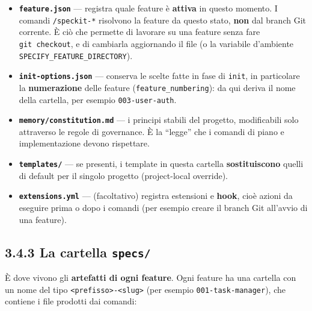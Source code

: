 \documentclass[
  italian,
  10pt,
]{book}
\providecommand{\tightlist}{%
  \setlength{\itemsep}{0pt}\setlength{\parskip}{0pt}}
\begin{document}
\begin{itemize}
\tightlist
\item
  \textbf{\texttt{feature.json}} --- registra quale feature è
  \textbf{attiva} in questo momento. I comandi \texttt{/speckit-*}
  risolvono la feature da questo stato, \textbf{non} dal branch Git
  corrente. È ciò che permette di lavorare su una feature senza fare
  \texttt{git\ checkout}, e di cambiarla aggiornando il file (o la
  variabile d'ambiente \texttt{SPECIFY\_FEATURE\_DIRECTORY}).
\item
  \textbf{\texttt{init-options.json}} --- conserva le scelte fatte in
  fase di \texttt{init}, in particolare la \textbf{numerazione} delle
  feature (\texttt{feature\_numbering}): da qui deriva il nome della
  cartella, per esempio \texttt{003-user-auth}.
\item
  \textbf{\texttt{memory/constitution.md}} --- i principi stabili del
  progetto, modificabili solo attraverso le regole di governance. È la
  ``legge'' che i comandi di piano e implementazione devono rispettare.
\item
  \textbf{\texttt{templates/}} --- se presenti, i template in questa
  cartella \textbf{sostituiscono} quelli di default per il singolo
  progetto (project-local override).
\item
  \textbf{\texttt{extensions.yml}} --- (facoltativo) registra estensioni
  e \textbf{hook}, cioè azioni da eseguire prima o dopo i comandi (per
  esempio creare il branch Git all'avvio di una feature).
\end{itemize}

\subsection{\texorpdfstring{3.4.3 La cartella
\texttt{specs/}}{3.4.3 La cartella specs/}}\label{la-cartella-specs}

È dove vivono gli \textbf{artefatti di ogni feature}. Ogni feature ha
una cartella con un nome del tipo
\texttt{\textless{}prefisso\textgreater{}-\textless{}slug\textgreater{}}
(per esempio \texttt{001-task-manager}), che contiene i file prodotti
dai comandi:
\end{document}
